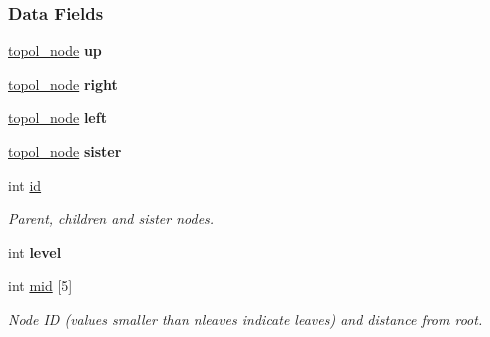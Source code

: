 \subsubsection*{Data Fields}
\begin{DoxyCompactItemize}
\item 
\mbox{\label{structtopol__node__struct_a747d302eeeec71b6c656e097e3a1658b}} 
\hyperlink{structtopol__node__struct}{topol\+\_\+node} {\bfseries up}
\item 
\mbox{\label{structtopol__node__struct_a0f2d377e06066861d52e5a55c4a057a5}} 
\hyperlink{structtopol__node__struct}{topol\+\_\+node} {\bfseries right}
\item 
\mbox{\label{structtopol__node__struct_ac89c082b65b84e5822126f95552e9aa4}} 
\hyperlink{structtopol__node__struct}{topol\+\_\+node} {\bfseries left}
\item 
\mbox{\label{structtopol__node__struct_a2c32701d91360029c423c9a3d166eabf}} 
\hyperlink{structtopol__node__struct}{topol\+\_\+node} {\bfseries sister}
\item 
\mbox{\label{structtopol__node__struct_aa59aaa71c57b79b7737eb72973485a0a}} 
int \hyperlink{structtopol__node__struct_aa59aaa71c57b79b7737eb72973485a0a}{id}
\begin{DoxyCompactList}\small\item\em Parent, children and sister nodes. \end{DoxyCompactList}\item 
\mbox{\label{structtopol__node__struct_a0163a947756838115a3da8590fd88e46}} 
int {\bfseries level}
\item 
\mbox{\label{structtopol__node__struct_a11adf7521b107205fafb609d23c75d52}} 
int \hyperlink{structtopol__node__struct_a11adf7521b107205fafb609d23c75d52}{mid} \mbox{[}5\mbox{]}
\begin{DoxyCompactList}\small\item\em Node ID (values smaller than nleaves indicate leaves) and distance from root. \end{DoxyCompactList}\item 

\end{DoxyCompactItemize}
